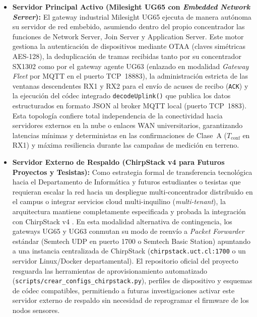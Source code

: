 \documentclass[12pt,oneside,openany,spanish,oldfontcommands]{memoir}
\begin{document}
\begin{itemize}
    \item \textbf{Servidor Principal Activo (Milesight UG65 con \textit{Embedded Network Server}):}
    El gateway industrial Milesight UG65 ejecuta de manera autónoma su servidor de red embebido,
    asumiendo dentro del propio concentrador las funciones de Network Server, Join Server y
    Application Server. Este motor gestiona la autenticación de dispositivos mediante OTAA
    (claves simétricas AES-128), la deduplicación de tramas recibidas tanto por su concentrador
    SX1302 como por el gateway agente UG63 (enlazado en modalidad \textit{Gateway Fleet} por
    MQTT en el puerto TCP~18883), la administración estricta de las ventanas descendentes RX1 y RX2
    para el envío de acuses de recibo (\texttt{ACK}) y la ejecución del códec integrado
    \texttt{decodeUplink()} que publica los datos estructurados en formato JSON al broker MQTT local
    (puerto TCP~1883). Esta topología confiere total independencia de la conectividad hacia servidores
    externos en la nube o enlaces WAN universitarios, garantizando latencias mínimas y deterministas
    en las confirmaciones de Clase~A ($T_{\mathrm{conf}}$ en RX1) y máxima resiliencia durante las
    campañas de medición en terreno.

    \item \textbf{Servidor Externo de Respaldo (ChirpStack v4 para Futuros Proyectos y Tesistas):}
    Como estrategia formal de transferencia tecnológica hacia el Departamento de Informática y
    futuros estudiantes o tesistas que requieran escalar la red hacia un despliegue multi-concentrador
    distribuido en el campus o integrar servicios cloud multi-inquilino (\textit{multi-tenant}), la
    arquitectura mantiene completamente especificada y probada la integración con ChirpStack v4 \parencite{chirpstack_v4}. En
    esta modalidad alternativa de contingencia, los gateways UG65 y UG63 conmutan su modo de reenvío
    a \textit{Packet Forwarder} estándar (Semtech UDP en puerto 1700 o Semtech Basic Station)
    apuntando a una instancia centralizada de ChirpStack (\texttt{chirpstack.uct.cl:1700} o un servidor
    Linux/Docker departamental). El repositorio oficial del proyecto resguarda las herramientas de
    aprovisionamiento automatizado (\texttt{scripts/crear\_configs\_chirpstack.py}), perfiles de
    dispositivo y esquemas de códec compatibles, permitiendo a futuras investigaciones activar este
    servidor externo de respaldo sin necesidad de reprogramar el firmware de los nodos sensores.
\end{itemize}
\end{document}
